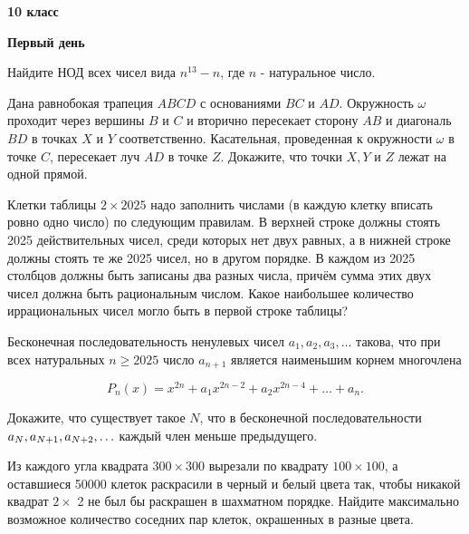 \centerline{\bf \Huge 10 класс}

\centerline{\bf \Large Первый день}

Найдите НОД всех чисел вида $n^{13}-n$, где $n$ - натуральное число.

Дана равнобокая трапеция $A B C D$ с основаниями $B C$ и $A D$. Окружность $\omega$ проходит через вершины $B$ и $C$ и вторично пересекает сторону $A B$ и диагональ $B D$ в точках $X$ и $Y$ соответственно. Касательная, проведенная к окружности $\omega$ в точке $C$, пересекает луч $A D$ в точке $Z$. Докажите, что точки $X, Y$ и $Z$ лежат на одной прямой.

Клетки таблицы $2 \times 2025$ надо заполнить числами (в каждую клетку вписать ровно одно число) по следующим правилам. В верхней строке должны стоять 2025 действительных чисел, среди которых нет двух равных, а в нижней строке должны стоять те же 2025 чисел, но в другом порядке. В каждом из 2025 столбцов должны быть записаны два разных числа, причём сумма этих двух чисел должна быть рациональным числом. Какое наибольшее количество иррациональных чисел могло быть в первой строке таблицы?

Бесконечная последовательность ненулевых чисел $a_1, a_2, a_3, \ldots$ такова, что при всех натуральных $n \geqslant 2025$ число $a_{n+1}$ является наименьшим корнем многочлена

$$
P_n(x)=x^{2 n}+a_1 x^{2 n-2}+a_2 x^{2 n-4}+\ldots+a_n .
$$


Докажите, что существует такое $N$, что в бесконечной последовательности $a_N, a_{N+1}, \\a_{N+2}, \ldots$ каждый член меньше предыдущего.

Из каждого угла квадрата $300 \times 300$ вырезали по квадрату $100 \times 100$, а оставшиеся 50000 клеток раскрасили в черный и белый цвета так, чтобы никакой квадрат $2 \times$ 2 не был бы раскрашен в шахматном порядке. Найдите максимально возможное количество соседних пар клеток, окрашенных в разные цвета.